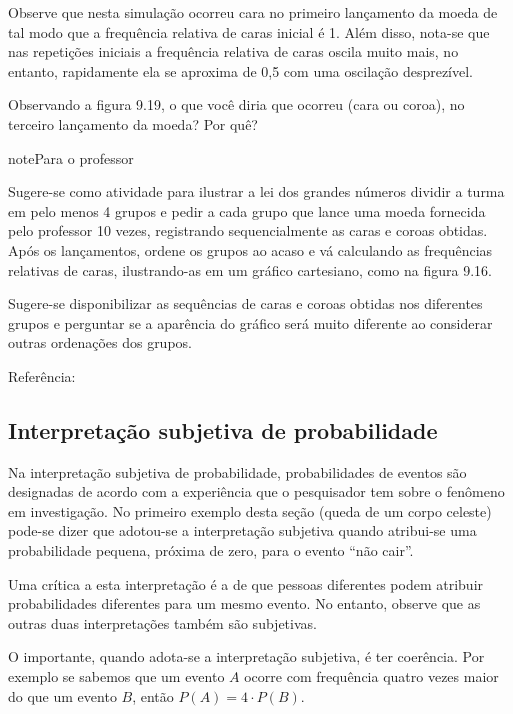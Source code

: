 Observe que nesta simulação ocorreu cara no primeiro lançamento da moeda de tal modo que a frequência relativa de caras inicial é 1.  Além disso, nota-se que nas repetições iniciais a frequência relativa de caras oscila muito mais, no entanto, rapidamente ela se aproxima de 0,5 com uma oscilação desprezível.

Observando a figura 9.19, o que você diria que ocorreu (cara ou coroa), no terceiro lançamento da moeda? Por quê?

\begin{sphinxadmonition}{note}{Para o professor}

Sugere-se como atividade para ilustrar a lei dos grandes números dividir a turma em pelo menos 4 grupos e pedir a cada grupo que lance uma moeda fornecida pelo professor 10 vezes, registrando sequencialmente as caras e coroas obtidas. Após os lançamentos, ordene os grupos ao acaso e vá calculando as frequências relativas de caras, ilustrando-as em um gráfico cartesiano, como na figura 9.16.

Sugere-se disponibilizar as sequências de caras e coroas obtidas nos diferentes grupos e perguntar se a aparência do gráfico será muito diferente ao considerar outras ordenações dos grupos.

Referência: 
\end{sphinxadmonition}


\subsection{Interpretação subjetiva de probabilidade}
\label{\detokenize{PE511-1:interpretacao-subjetiva-de-probabilidade}}
Na interpretação subjetiva de probabilidade, probabilidades de eventos são designadas de acordo com a experiência que o pesquisador tem sobre o fenômeno em investigação. No primeiro exemplo desta seção (queda de um corpo celeste) pode-se dizer que adotou-se a interpretação subjetiva quando atribui-se uma probabilidade pequena, próxima de zero, para o evento “não cair”.

Uma crítica a esta interpretação é a de que pessoas diferentes podem atribuir probabilidades diferentes para um mesmo evento. No entanto, observe que as outras duas interpretações também são subjetivas.

O importante, quando adota-se a interpretação subjetiva, é ter coerência. Por exemplo se sabemos que um evento \(A\) ocorre com frequência quatro vezes maior do que um evento \(B\), então \(P(A)=4\cdot P(B)\).


